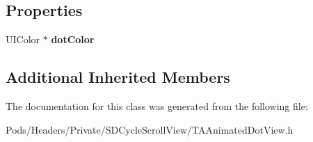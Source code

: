 \subsection*{Properties}
\begin{DoxyCompactItemize}
\item 
\mbox{\label{interface_t_a_animated_dot_view_ab57a735223e541c4033e19687fb9f112}} 
U\+I\+Color $\ast$ {\bfseries dot\+Color}
\end{DoxyCompactItemize}
\subsection*{Additional Inherited Members}


The documentation for this class was generated from the following file\+:\begin{DoxyCompactItemize}
\item 
Pods/\+Headers/\+Private/\+S\+D\+Cycle\+Scroll\+View/T\+A\+Animated\+Dot\+View.\+h\end{DoxyCompactItemize}

